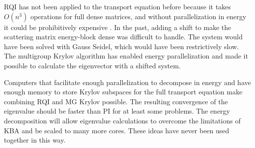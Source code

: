 RQI has not been applied to the transport equation before because it takes $O(n^{3})$ operations for full dense matrices, and without parallelization in energy it could be prohibitively expensive \cite{Stewart2001}. In the past, adding a shift to make the scattering matrix energy-block dense was difficult to handle. The system would have been solved with Gauss Seidel, which would have been restrictively slow. The multigroup Krylov algorithm has enabled energy parallelization and made it possible to calculate the eigenvector with a shifted system.

Computers that facilitate enough parallelization to decompose in energy and have enough memory to store Krylov subspaces for the full transport equation make combining RQI and MG Krylov possible. The resulting convergence of the eigenvalue should be faster than PI for at least some problems. The energy decomposition will allow eigenvalue calculations to overcome the limitations of KBA and be scaled to many more cores. These ideas have never been used together in this way. 

\separatorpage{}
